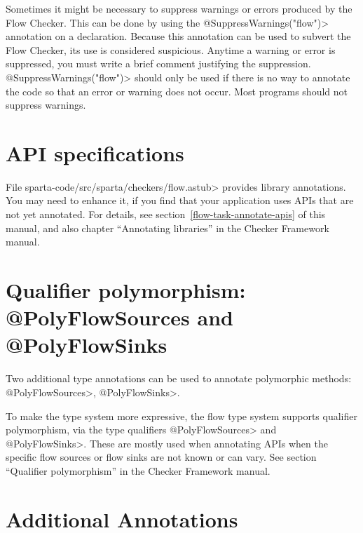  Sometimes it might be necessary to suppress warnings or errors produced by the
  Flow Checker.  This can be done by using the  \<@SuppressWarnings("flow")> annotation
   on a declaration.  Because this annotation can be used to subvert the Flow Checker, its use
   is considered suspicious.  Anytime a warning or error is suppressed, you must 
   write a brief comment justifying the suppression.     \<@SuppressWarnings("flow")> should
   only be used if there is no way to annotate the code so that an error or warning does not occur. 
   Most programs should not suppress warnings. 


\section{API specifications\label{sec:apispecs}}

File \<sparta-code/src/sparta/checkers/flow.astub> provides library
annotations.  You may need to enhance it, if you find that your application
uses APIs that are not yet annotated.  For details, see
section~\ref{flow-task-annotate-apis} of this manual, and also 
chapter
``Annotating libraries'' in the Checker Framework manual.


\section{Qualifier polymorphism: @PolyFlowSources  and @PolyFlowSinks \label{sec:polyflowsources}}

Two additional type annotations can be used to annotate polymorphic
methods: \<@PolyFlowSources>, \<@PolyFlowSinks>.

To make the type system more expressive, the flow type system supports
qualifier polymorphism, via the type qualifiers \<@PolyFlowSources> and
\<@PolyFlowSinks>.  These are mostly used when annotating APIs when the
specific flow sources or flow sinks are not known or can vary. 
See section ``Qualifier polymorphism'' in the Checker Framework manual.  




\section{Additional Annotations\label{sec:addtionalanno}}

